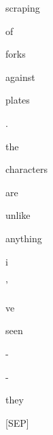 \documentclass[varwidth=150mm]{standalone}
\begin{document}
\begin{CJK*}{UTF8}{gbsn}
{{{\colorbox{red!2.3949122428894043}{\strut scraping} \colorbox{red!1.7651491165161133}{\strut of} \colorbox{red!51.485443115234375}{\strut forks} \colorbox{red!3.3272035121917725}{\strut against} \colorbox{red!85.56079864501953}{\strut plates} \colorbox{red!0.0}{\strut .} \colorbox{red!19.660009384155273}{\strut the} \colorbox{red!2.2302496433258057}{\strut characters} \colorbox{red!7.82937479019165}{\strut are} \colorbox{red!2.6086490154266357}{\strut unlike} \colorbox{red!1.5264760255813599}{\strut anything} \colorbox{red!15.538625717163086}{\strut i} \colorbox{red!0.0}{\strut '} \colorbox{red!0.0}{\strut ve} \colorbox{red!10.292646408081055}{\strut seen} \colorbox{red!6.721072196960449}{\strut -} \colorbox{red!32.33153533935547}{\strut -} \colorbox{red!19.29241180419922}{\strut they} \colorbox{red!16.551891326904297}{\strut [SEP]}
}}}
\end{CJK*}
\end{document}
